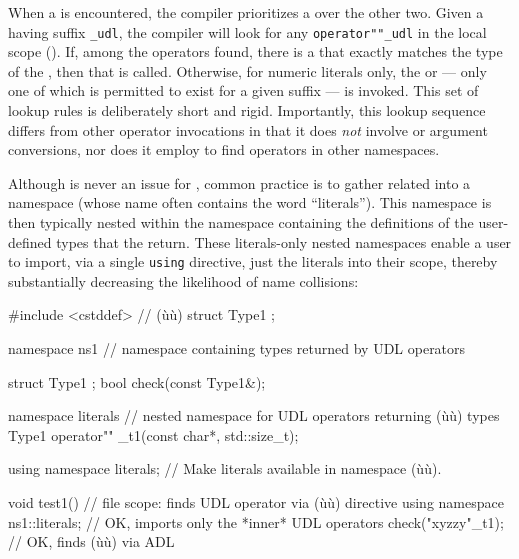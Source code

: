 When a  is encountered, the compiler prioritizes a
 over the other two. Given a
 having suffix \lstinline!_udl!, the compiler will look for
any \lstinline!operator""_udl! in the local scope (). If, among the operators found, there is a
 that exactly matches the type of
the , then that  is called.
Otherwise, for numeric literals only, the  or
 --- only one of which is permitted to exist
for a given suffix --- is invoked. This set of lookup rules is deliberately
short and rigid. Importantly, this lookup sequence differs from other
operator invocations in that it does \emph{not} involve  or argument conversions, nor does it employ
 to find operators in
other namespaces.

Although  is never an issue for , common
practice is to gather related  into a namespace
(whose name often contains the word ``literals''). This namespace is
then typically nested within the namespace containing the definitions of
the user-defined types that the  return. These
literals-only nested namespaces enable a user to import, via a single
\lstinline!using! directive, just the literals into their scope, thereby
substantially decreasing the likelihood of name collisions:

\begin{emcppshiddenlisting}[emcppsbatch=e8]
#include <cstddef>  // (ù{}ù)
struct Type1 {};
\end{emcppshiddenlisting}
\begin{emcppslisting}[emcppsbatch=e8]
namespace ns1  // namespace containing types returned by UDL operators
{
    struct Type1 { };
    bool check(const Type1&);

    namespace literals  // nested namespace for UDL operators returning (ù{}ù) types
    {
        Type1 operator"" _t1(const char*, std::size_t);
    }

    using namespace literals;  // Make literals available in namespace (ù{}ù).
}

void test1()  // file scope: finds UDL operator via (ù{}ù) directive
{
    using namespace ns1::literals;  // OK, imports only the *inner* UDL operators
    check("xyzzy"_t1);              // OK, finds (ù{}ù) via ADL
}
\end{emcppslisting}

